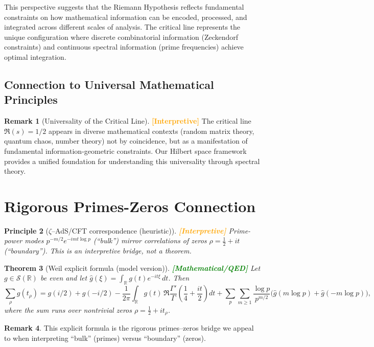 \documentclass[12pt]{article}
\theoremstyle{plain}
\newtheorem{theorem}{Theorem}[section]
\newtheorem{principle}[theorem]{Principle}
\theoremstyle{definition}
\newtheorem{remark}[theorem]{Remark}
\newcommand{\statusmath}{\textcolor{green}{\textbf{[Mathematical/QED]}}}
\newcommand{\statusinterp}{\textcolor{orange}{\textbf{[Interpretive]}}}
\begin{document}
This perspective suggests that the Riemann Hypothesis reflects fundamental constraints on how mathematical information can be encoded, processed, and integrated across different scales of analysis. The critical line represents the unique configuration where discrete combinatorial information (Zeckendorf constraints) and continuous spectral information (prime frequencies) achieve optimal integration.

\subsection{Connection to Universal Mathematical Principles}

\begin{remark}[Universality of the Critical Line] \statusinterp
The critical line $\Re(s) = 1/2$ appears in diverse mathematical contexts (random matrix theory, quantum chaos, number theory) not by coincidence, but as a manifestation of fundamental information-geometric constraints. Our Hilbert space framework provides a unified foundation for understanding this universality through spectral theory.
\end{remark}

\section{Rigorous Primes-Zeros Connection}

\begin{principle}[$\zeta$–AdS/CFT correspondence (heuristic)] \statusinterp
Prime-power modes $p^{-m/2}e^{-imt\log p}$ (``bulk'') mirror correlations of zeros
$\rho=\tfrac12+it$ (``boundary''). This is an interpretive bridge, not a theorem.
\end{principle}

\begin{theorem}[Weil explicit formula (model version)] \statusmath
Let $g\in\mathcal S(\mathbb{R})$ be even and let $\widehat g(\xi)=\int_{\mathbb{R}}g(t)e^{-it\xi}\,dt$.
Then
\[
\sum_{\rho} g(t_\rho)
= g(i/2)+g(-i/2)
-\frac{1}{2\pi}\int_{\mathbb{R}} g(t)\,\Re\frac{\Gamma'}{\Gamma}\!\left(\frac{1}{4}+\frac{it}{2}\right) dt
+\sum_{p}\sum_{m\ge1}\frac{\log p}{p^{m/2}}\bigl(\widehat g(m\log p)+\widehat g(-m\log p)\bigr),
\]
where the sum runs over nontrivial zeros $\rho=\tfrac12+it_\rho$.
\end{theorem}

\begin{remark}
This explicit formula is the rigorous primes–zeros bridge we appeal to when interpreting
``bulk'' (primes) versus ``boundary'' (zeros).
\end{remark}
\end{document}
